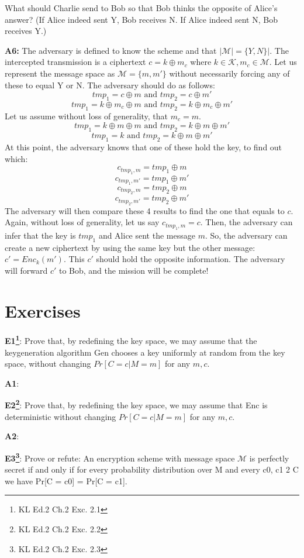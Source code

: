 \documentclass[12pt,reqno]{amsart}
\newcommand{\mand}[0]{\text{ and }}
\newcommand{\msgspc}[0]{\mathcal{M}}
\begin{document}
What should Charlie send to Bob so that Bob thinks the opposite of Alice’s answer?
(If Alice indeed sent Y, Bob receives N. If Alice indeed sent N, Bob receives Y.)

\textbf{A6:} The adversary is defined to know the scheme and that $|\mathcal{M}|=\{Y,N\}|$. The intercepted transmission is a ciphertext $c=k \oplus m_c$ where $k\in \mathcal{K}, m_c \in \mathcal{M}$. Let us represent the message space as $\mathcal{M}=\{m, m'\}$ without necessarily forcing any of these to equal Y or N. The adversary should do as follows:
$$
tmp_1 = c \oplus m \mand tmp_2 = c \oplus m'
$$
$$
tmp_1 = k \oplus m_c \oplus m \mand tmp_2 = k \oplus m_c \oplus m'
$$
Let us assume without loss of generality, that $m_c = m$.
$$
tmp_1 = k \oplus m \oplus m \mand tmp_2 = k \oplus m \oplus m'
$$
$$
tmp_1 = k \mand tmp_2 = k \oplus m \oplus m'
$$
At this point, the adversary knows that one of these hold the key, to find out which:
$$
c_{tmp_1,m} = tmp_1 \oplus m
$$
$$
c_{tmp_1,m'} = tmp_1 \oplus m'
$$
$$
c_{tmp_2,m} = tmp_2 \oplus m
$$
$$
c_{tmp_2,m'} = tmp_2 \oplus m'
$$
The adversary will then compare these 4 results to find the one that equals to $c$. Again, without loss of generality, let us say $c_{tmp_1,m} = c$. Then, the adversary can infer that the key is $tmp_1$ and Alice sent the message $m$. So, the adversary can create a new ciphertext by using the same key but the other message: $c' = Enc_k(m')$. This $c'$ should hold the opposite information. The adversary will forward $c'$ to Bob, and the mission will be complete!

\section{Exercises}

\textbf{E1\footnote{KL Ed.2 Ch.2 Exc. 2.1}}:  Prove that, by redefining the key space, we may assume that the keygeneration algorithm Gen chooses a key uniformly at random from the key space, without changing $Pr[C = c | M = m]$ for any $m, c$.

\textbf{A1}:  

\vspace{20px}
\textbf{E2\footnote{KL Ed.2 Ch.2 Exc. 2.2}}:  Prove that, by redefining the key space, we may assume that Enc is deterministic without changing $Pr[C = c | M = m]$ for any $m, c$.

\textbf{A2}:  

\vspace{20px}
\textbf{E3\footnote{KL Ed.2 Ch.2 Exc. 2.3}}:  Prove or refute: An encryption scheme with message space $\msgspc$ is perfectly secret if and only if for every probability distribution over M and every c0, c1 2 C we have Pr[C = c0] = Pr[C = c1].
\end{document}
